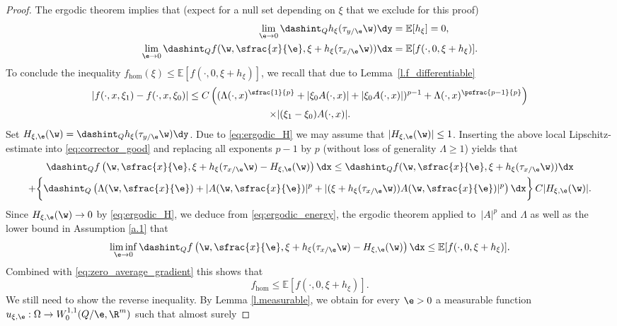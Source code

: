 \begin{proof}
The ergodic theorem implies that (expect for a null set depending on $\xi$ that we exclude for this proof)
\begin{align}
\lim_{\e\to 0}\dashint_Qh_{\xi}(\tau_{y/\e}\w)\dy&=\mathbb{E}[h_{\xi}]=0,\label{eq:ergodic_H}
\\
\lim_{\e\to 0}\dashint_Q f(\w,\sfrac{x}{\e},\xi+h_{\xi}(\tau_{x/\e}\w))\dx&=\mathbb{E}[f(\cdot,0,\xi+h_{\xi})].\label{eq:ergodic_energy}
\end{align}
To conclude the inequality $f_{\hom}(\xi)\leq \mathbb{E}[f(\cdot,0,\xi+h_{\xi})]$, we recall that due to Lemma~\ref{l.f_differentiable}
\begin{multline*}
|f(\cdot,x,\xi_1)-f(\cdot,x,\xi_0)|\leq C \left((\Lambda(\cdot,x)^{\sfrac{1}{p}}+|\xi_0A(\cdot,x)|+|\xi_0A(\cdot,x)|)^{p-1}+\Lambda(\cdot,x)^{\psfrac{p-1}{p}}\right)
\\
\times |(\xi_1-\xi_0)A(\cdot,x)|.
\end{multline*}
Set $H_{\xi,\e}(\w)=\dashint_Q h_{\xi}(\tau_{y/\e}\w)\dy$. Due to \eqref{eq:ergodic_H} we may assume that $|H_{\xi,\e}(\w)|\leq 1$. Inserting the above local Lipschitz-estimate into \eqref{eq:corrector_good} and replacing all exponents $p-1$ by $p$ (without loss of generality $\Lambda\geq 1$) yields that
\begin{multline*}
\dashint_Q f\left(\w,\sfrac{x}{\e},\xi+h_{\xi}(\tau_{x/\e}\w)-H_{\xi,\e}(\w)\right)\dx\leq \dashint_Q f(\w,\sfrac{x}{\e},\xi+h_{\xi}(\tau_{x/\e}\w))\dx
\\
+\biggl\{\dashint_Q \left(\Lambda(\w,\sfrac{x}{\e})+|A(\w,\sfrac{x}{\e})|^p +|(\xi+h_{\xi}(\tau_{x/\e}\w))A(\w,\sfrac{x}{\e})|^p\right)\dx
\biggr\} \,C|H_{\xi,\e}(\w)|.
\end{multline*}
Since $H_{\xi,\e}(\w)\to 0$ by \eqref{eq:ergodic_H}, we deduce from \eqref{eq:ergodic_energy}, the ergodic theorem applied to~$|A|^p$ and $\Lambda$ as well as the lower bound in Assumption \ref{a.1} that
\begin{equation*}
\liminf_{\e\to 0}\dashint_Q f\left(\w,\sfrac{x}{\e},\xi+h_{\xi}(\tau_{x/\e}\w)-H_{\xi,\e}(\w)\right)\dx\leq \mathbb{E}[f(\cdot,0,\xi+h_{\xi})].
\end{equation*}
Combined with \eqref{eq:zero_average_gradient} this shows that \begin{equation}\label{eq:oneinequality}
f_{\hom}\leq \mathbb{E}[f(\cdot,0,\xi+h_{\xi})].
\end{equation}
We still need to show the reverse inequality. By Lemma \ref{l.measurable}, we obtain for every $\e>0$ a measurable function $u_{\xi,\e}:\Omega\to W^{1,1}_0(Q/\e,\R^m)$ such that almost surely

\end{proof}
